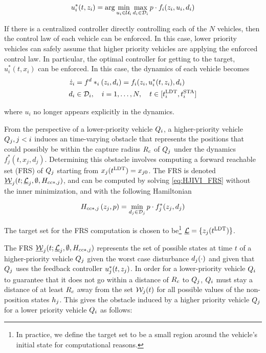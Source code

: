 \begin{equation}
\label{eq:opt_ctrl_i}
\ctrl_i^*(t, \state_i) =  \arg \min_{\ctrl_i \in \cset_i} \max_{\dstb_i \in \dset_i} p \cdot \fdyn_i(\state_i, \ctrl_i, \dstb_i)
\end{equation}

If there is a centralized controller directly controlling each of the $N$ vehicles, then the control law of each vehicle can be enforced. In this case, lower priority vehicles can safely assume that higher priority vehicles are applying the enforced control law. In particular, the optimal controller for getting to the target, $u^*_i(t, x_i)$ can be enforced. In this case, the dynamics of each vehicle becomes 
\vspace{-0.3em}
\begin{equation}
\label{eq:dyn_cc}
\begin{aligned}
\dot \state_i &= \fdyn^\dstb*_i (\state_i, \dstb_i) = \fdyn_i(\state_i, \ctrl^*_i(t, \state_i), \dstb_i) \\
\dstb_i &\in \dset_i, \quad i = 1,\ldots, N, \quad t \in [\ldt_i, \sta_i]
\end{aligned}
\end{equation}

\noindent where $u_i$ no longer appears explicitly in the dynamics.

From the perspective of a lower-priority vehicle $Q_{i}$, a higher-priority vehicle $Q_{j}, j < i$ induces an time-varying obstacle that represents the positions that could possibly be within the capture radius $R_c$ of $Q_{j}$ under the dynamics $f^*_j(t, x_j, d_j)$. Determining this obstacle involves computing a forward reachable set (FRS) of $Q_{j}$ starting from $x_j(t^\text{LDT}) = x_{j0}$. The FRS is denoted $\underline{\mathcal{W}}_j(t; \underline{\mathcal{L}}_j, \emptyset, H_{cc*,j})$, and can be computed by solving \eqref{eq:HJIVI_FRS} without the inner minimization, and with the following Hamiltonian

\begin{equation}
H_{cc*,j}\left(z_j, p\right) = \min_{d_j \in \mathcal{D}_j} p \cdot f^*_j(z_j, d_j)
\end{equation}

The target set for the FRS computation is chosen to be\footnote{In practice, we define the target set to be a small region around the vehicle's initial state for computational reasons.} $\underline {\mathcal{L}} = \{z_j(t^\text{LDT})\}$.

The FRS $\underline{\mathcal{W}}_j(t; \underline{\mathcal{L}}_j, \emptyset, H_{cc*,j})$ represents the set of possible states at time $t$ of a higher-priority vehicle $Q_{j}$ given the worst case disturbance $d_j(\cdot)$ and given that $Q_{j}$ uses the feedback controller $u_j^*(t, z_j)$. In order for a lower-priority vehicle $Q_{i}$ to guarantee that it does not go within a distance of $R_c$ to $Q_{j}$, $Q_{i}$ must stay a distance of at least $R_c$ away from the set $\mathcal{W}_j(t)$ for all possible values of the non-position states $h_j$. This gives the obstacle induced by a higher priority vehicle $Q_{j}$ for a lower priority vehicle $Q_{i}$ as follows:

